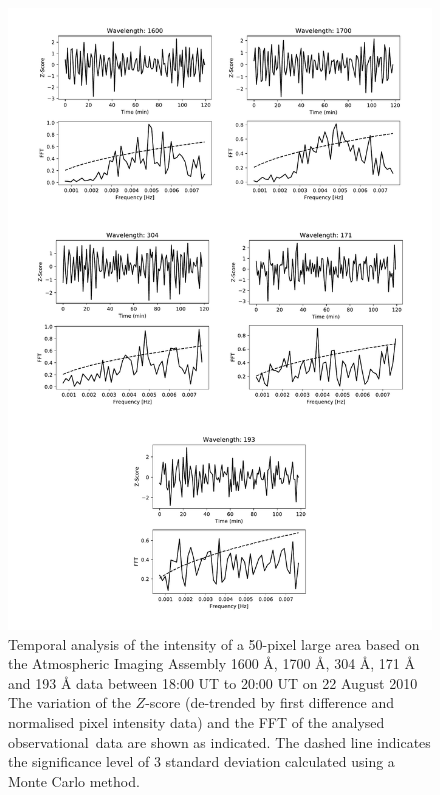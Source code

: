 \documentclass[physics,article,accept,pdftex,moreauthors]{Definitions/mdpi}
\begin{document}
\begin{figure}[H]
        \includegraphics[scale=0.55]{QS_FFT.pdf}
    \caption{Temporal analysis of the intensity of a 50-pixel large area based on %
 {the Atmospheric Imaging Assembly} 
 1600 {\AA}, 1700 {\AA}, 304 {\AA}, 171 {\AA} and 193 {\AA} {data} 
between 18:00 UT to 20:00 UT on 22 August 2010 %
 {The} %
 variation of the {$Z$-score} 
(de-trended by first difference and normalised pixel intensity data) {and} %
the FFT of the 
analysed observational~data {are shown as indicated.} 
 {The dashed line} indicates  the significance level of 3 standard deviation calculated using a Monte Carlo method. %
\label{fig12}}
\end{figure}
\end{document}
